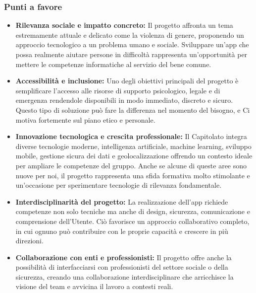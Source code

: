 \documentclass[a4paper,12pt]{article}
\begin{document}
\subsubsection{Punti a favore}
\begin{itemize}
    \item \textbf{Rilevanza sociale e impatto concreto:} Il progetto affronta un tema estremamente attuale e delicato come la violenza di genere, proponendo un approccio tecnologico a un problema umano e sociale. Sviluppare un’app che possa realmente aiutare persone in difficoltà rappresenta un’opportunità per mettere le competenze informatiche al servizio del bene comune.
    \item \textbf{Accessibilità e inclusione:} Uno degli obiettivi principali del progetto è semplificare l’accesso alle risorse di supporto psicologico, legale e di emergenza rendendole disponibili in modo immediato, discreto e sicuro. Questo tipo di soluzione può fare la differenza nel momento del bisogno, e Ci motiva fortemente sul piano etico e personale.
    \item \textbf{Innovazione tecnologica e crescita professionale:} Il Capitolato integra diverse tecnologie moderne, intelligenza artificiale, machine learning, sviluppo mobile, gestione sicura dei dati e geolocalizzazione offrendo un contesto ideale per ampliare le competenze del gruppo. Anche se alcune di queste aree sono nuove per noi, il progetto rappresenta una sfida formativa molto stimolante e un’occasione per sperimentare tecnologie di rilevanza fondamentale.
    \item \textbf{Interdisciplinarità del progetto:} La realizzazione dell’app richiede competenze non solo tecniche ma anche di design, sicurezza, comunicazione e comprensione dell’Utente. Ciò favorisce un approccio collaborativo completo, in cui ognuno può contribuire con le proprie capacità e crescere in più direzioni.
    \item \textbf{Collaborazione con enti e professionisti:} Il progetto offre anche la possibilità di interfacciarsi con professionisti del settore sociale o della sicurezza, creando una collaborazione interdisciplinare che arricchisce la visione del team e avvicina il lavoro a contesti reali.
\end{itemize}
\end{document}
